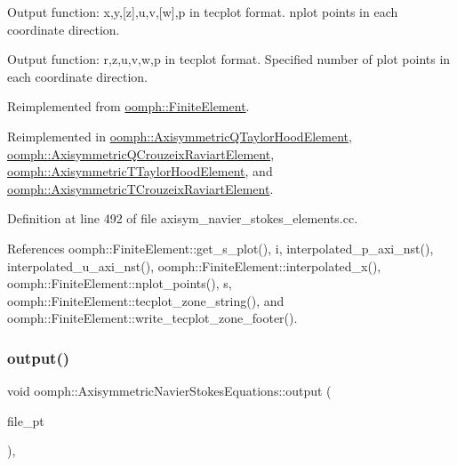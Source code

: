 Output function\+: x,y,\mbox{[}z\mbox{]},u,v,\mbox{[}w\mbox{]},p in tecplot format. nplot points in each coordinate direction. 

Output function\+: r,z,u,v,w,p in tecplot format. Specified number of plot points in each coordinate direction. 

Reimplemented from \hyperlink{classoomph_1_1FiniteElement_afa9d9b2670f999b43e6679c9dd28c457}{oomph\+::\+Finite\+Element}.



Reimplemented in \hyperlink{classoomph_1_1AxisymmetricQTaylorHoodElement_a73bc9729dd01b61e467d4fdc7d8b802c}{oomph\+::\+Axisymmetric\+Q\+Taylor\+Hood\+Element}, \hyperlink{classoomph_1_1AxisymmetricQCrouzeixRaviartElement_afb5ef7f9b09d4b3ed6d5ee04cad58fec}{oomph\+::\+Axisymmetric\+Q\+Crouzeix\+Raviart\+Element}, \hyperlink{classoomph_1_1AxisymmetricTTaylorHoodElement_a10ec676703edbf68120256082aa8c290}{oomph\+::\+Axisymmetric\+T\+Taylor\+Hood\+Element}, and \hyperlink{classoomph_1_1AxisymmetricTCrouzeixRaviartElement_ae59a58576380d29570f9ea326d653e5b}{oomph\+::\+Axisymmetric\+T\+Crouzeix\+Raviart\+Element}.



Definition at line 492 of file axisym\+\_\+navier\+\_\+stokes\+\_\+elements.\+cc.



References oomph\+::\+Finite\+Element\+::get\+\_\+s\+\_\+plot(), i, interpolated\+\_\+p\+\_\+axi\+\_\+nst(), interpolated\+\_\+u\+\_\+axi\+\_\+nst(), oomph\+::\+Finite\+Element\+::interpolated\+\_\+x(), oomph\+::\+Finite\+Element\+::nplot\+\_\+points(), s, oomph\+::\+Finite\+Element\+::tecplot\+\_\+zone\+\_\+string(), and oomph\+::\+Finite\+Element\+::write\+\_\+tecplot\+\_\+zone\+\_\+footer().

\mbox{\label{classoomph_1_1AxisymmetricNavierStokesEquations_a61129dd7505ac363862946bd8b3ea5bf}} 
\subsubsection{\texorpdfstring{output()}{output()}\hspace{0.1cm}{\footnotesize\ttfamily [3/4]}}
{\footnotesize\ttfamily void oomph\+::\+Axisymmetric\+Navier\+Stokes\+Equations\+::output (\begin{DoxyParamCaption}\item[{F\+I\+LE $\ast$}]{file\+\_\+pt }\end{DoxyParamCaption})\hspace{0.3cm}{\ttfamily [inline]}, {\ttfamily [virtual]}}



